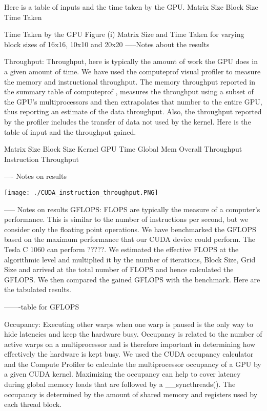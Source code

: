\documentclass[11pt, twocolumn]{article}
\begin{document}
    Here is a table of  inputs and the time taken by the GPU.
    Matrix Size Block Size  Time Taken


    Time Taken by the GPU
    Figure (i) Matrix Size and Time Taken for varying block sizes of 16x16, 10x10 and 20x20
    -----Notes about the results

    Throughput:  Throughput, here is typically the amount of work the GPU does in a given amount of time. We have used the computeprof visual profiler to measure the memory and instructional throughput. The memory throughput reported in the summary table of computeprof ,  measures  the throughput using a subset of the GPU’s multiprocessors and then extrapolates that number to the entire GPU, thus reporting an estimate of the data throughput. Also, the throughput reported by the profiler includes the transfer of data not used by the kernel.  Here is the table of input and the throughput gained.




    Matrix Size Block Size     Kernel   GPU Time    Global Mem Overall Throughput   Instruction Throughput


    ---- Notes on results

    \texttt{[image: ./CUDA\_instruction\_throughput.PNG]}

    ----- Notes on results
    GFLOPS:   FLOPS are typically the measure of a computer’s performance.
    This is similar to the number of instructions per second, but we consider only the floating point operations.
    We have benchmarked the GFLOPS based on the maximum performance that our CUDA device could perform.
    The Tesla C 1060 can perform ?????.
    We estimated the effective FLOPS at the algorithmic level and multiplied it by the number of iterations, Block Size, Grid Size and arrived at the total number of FLOPS and hence calculated the GFLOPS.
    We then compared the gained GFLOPS with the benchmark.
    Here are the tabulated results.

    -------table for GFLOPS

    Occupancy:  Executing other warps when one warp is paused is the only way to hide latencies and keep the hardware busy.
    Occupancy is related to the number of active warps on a multiprocessor and is therefore important in determining how effectively the hardware is kept busy.
    We used the CUDA occupancy calculator and the Compute Profiler  to calculate the multiprocessor occupancy of a GPU by a given CUDA kernel.
    Maximizing the occupancy can help to cover latency during global memory loads that are followed by a \_\_syncthreads().
    The occupancy is determined by the amount of shared memory and registers used by each thread block.
\end{document}
